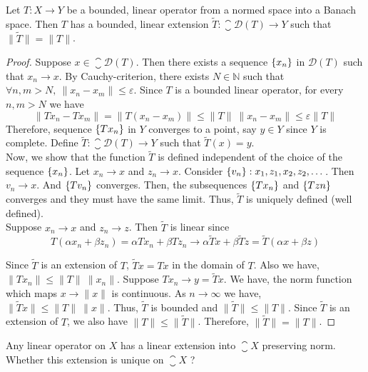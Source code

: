 \begin{theorem}
	Let $T : X \to Y$ be a bounded, linear operator from a normed space into a Banach space.
	Then $T$ has a bounded, linear extension $\tilde{T} : \closure{\mathscr{D}(T)} \to Y$ such that $\|\tilde{T}\| = \|T\|$.
\end{theorem}
\begin{proof}
	Suppose $x \in \closure{\mathscr{D}(T)}$.
	Then there exists a sequence $\left\{x_n\right\}$ in $\mathscr{D}(T)$ such that $x_n \to x$.
	By Cauchy-criterion, there exists $N \in \mathbb{N}$ such that $\forall n,m > N,\ \|x_n - x_m\| \le \varepsilon$.
	Since $T$ is a bounded linear operator, for every $n,m > N$ we have
	\[ \|Tx_n - Tx_m\| = \|T(x_n-x_m)\| \le \|T\| \ \|x_n-x_m\| \le \varepsilon \|T\| \]
	Therefore, sequence $\left\{Tx_n\right\}$ in $Y$ converges to a point, say $y \in Y$ since $Y$ is complete.
	Define $\tilde{T} : \closure{\mathscr{D}(T)} \to Y$ such that $\tilde{T}(x) = y$.\\

	Now, we show that the function $\tilde{T}$ is defined independent of the choice of the sequence $\left\{x_n\right\}$.
	Let $x_n \to x$ and $z_n \to x$.
	Consider $\left\{v_n\right\} : x_1,z_1,x_2,z_2,\dotsc$.
	Then $v_n \to x$.
	And $\left\{Tv_n\right\}$ converges.
	Then, the subsequences $\left\{Tx_n\right\}$ and $\left\{Tzn\right\}$ converges and they must have the same limit.
	Thus, $\tilde{T}$ is uniquely defined (well defined).\\

	Suppose $x_n \to x$ and $z_n \to z$.
	Then $\tilde{T}$ is linear since 
	\[ T(\alpha x_n + \beta z_n) = \alpha Tx_n + \beta Tz_n \to \alpha \tilde{T}x + \beta \tilde{T}z = \tilde{T}(\alpha x + \beta z) \]

	Since $\tilde{T}$ is an extension of $T$, $\tilde{T}x = Tx$ in the domain of $T$.
	Also we have, $\|Tx_n\| \le \|T\|\ \|x_n\|$.
	Suppose $Tx_n \to y = \tilde{T}x$.
	We have, the norm function which maps $x \to \|x\|$ is continuous.
	As $n \to \infty$ we have, $\| \tilde{T}x \| \le \|T\|\ \|x\|$.
	Thus, $\tilde{T}$ is bounded and $\|\tilde{T}\| \le \|T\|$.
	Since $\tilde{T}$ is an extension of $T$, we also have $\|T\| \le \| \tilde{T}\|$.
	Therefore, $\|\tilde{T}\| = \|T\|$.
\end{proof}

\begin{challenge}
	Any linear operator on $X$ has a linear extension into $\closure{X}$ preserving norm.
	Whether this extension is unique on $\closure{X}$ ?
\end{challenge}

